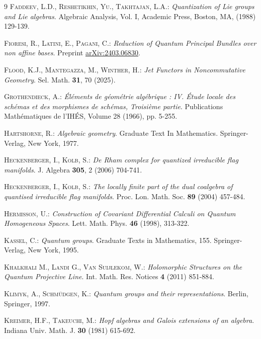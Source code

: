 \documentclass{article}
\theoremstyle{definition}
\begin{document}
{\begin{thebibliography}{9}
	\textsc{Faddeev, L.D., Reshetikhin, Yu., Takhtajan, L.A.:}
	\textit{Quantization of Lie groups and Lie algebras}. 
	Algebraic Analysis, Vol. I, Academic Press, Boston, MA, (1988) 129-139.
	
	\textsc{Fioresi, R., Latini, E., Pagani, C.:}
	\textit{Reduction of Quantum Principal Bundles over non affine bases}. Preprint \hyperlink{https://arxiv.org/abs/2403.06830}{arXiv:2403.06830}.
	
	\textsc{Flood, K.J., Mantegazza, M., Winther, H.:}
	\textit{Jet Functors in Noncommutative Geometry}. 
	Sel. Math. \textbf{31}, 70 (2025).
	
	\textsc{Grothendieck, A.:}
	\textit{Éléments de géométrie algébrique : IV. Étude locale des schémas et des morphismes de schémas, Troisième partie}.
	Publications Mathématiques de l'IHÉS, Volume 28 (1966), pp. 5-255. 
	
	
	\textsc{Hartshorne, R.:}  
	\textit{Algebraic geometry}.
	Graduate Text In Mathematics. Springer-Verlag, New York, 1977.
	
	\textsc{Heckenberger, I., Kolb, S.:}
	\textit{De Rham complex for quantized irreducible flag manifolds}.
	J. Algebra \textbf{305}, 2 (2006) 704-741.
	
	\textsc{Heckenberger, I., Kolb, S.:}
	\textit{The locally finite part of the dual coalgebra of
		quantised irreducible flag manifolds}. Proc. Lon. Math. Soc. \textbf{89} (2004)
	457-484.
	
	\textsc{Hermisson,  U.:} 
	\textit{Construction of Covariant Differential Calculi on Quantum Homogeneous Spaces}.
	Lett. Math. Phys. \textbf{46} (1998), 313-322.
	
	\textsc{Kassel, C.:}
	\emph{Quantum groups}. 
	Graduate Texts in Mathematics, 155. Springer-Verlag, New York, 1995.
	
	\textsc{Khalkhali M., Landi G., Van Suijlekom, W.:} 
	\textit{Holomorphic Structures on the Quantum Projective Line}. 
	Int. Math. Res. Notices \textbf{4} (2011)  851-884.
	
	
	\textsc{Klimyk, A., Schm\"{u}dgen, K.:}
	\textit{Quantum groups and their representations}. 
	Berlin, Springer, 1997.
	
	\textsc{Kreimer, H.F., {Takeuchi}, M.:}  
	\emph{Hopf algebras and Galois extensions of an algebra}. 
	Indiana Univ. Math. J. \textbf{30} (1981) 615-692.
	

\end{thebibliography}}
\end{document}
